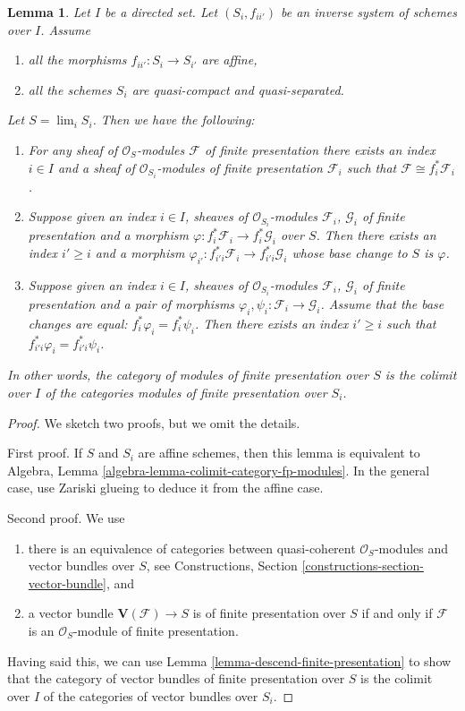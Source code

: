 \documentclass{stacks-project}
\theoremstyle{plain}
\newtheorem{lemma}[subsection]{Lemma}
\theoremstyle{definition}
\theoremstyle{remark}
\numberwithin{equation}{subsection}
\def\lim{\mathop{\mathrm{lim}}\nolimits}
\begin{document}
\begin{lemma}
\label{lemma-descend-modules-finite-presentation}
Let $I$ be a directed set.
Let $(S_i, f_{ii'})$ be an inverse system of schemes over $I$.
Assume
\begin{enumerate}
\item all the morphisms $f_{ii'} : S_i \to S_{i'}$ are affine,
\item all the schemes $S_i$ are quasi-compact and quasi-separated.
\end{enumerate}
Let $S = \lim_i S_i$. Then we have the following:
\begin{enumerate}
\item For any sheaf of $\mathcal{O}_S$-modules
$\mathcal{F}$ of finite presentation there exists an index
$i \in I$ and a sheaf of $\mathcal{O}_{S_i}$-modules of finite
presentation $\mathcal{F}_i$ such that
$\mathcal{F} \cong f_i^*\mathcal{F}_i$.
\item Suppose given an index $i \in I$, sheaves
of $\mathcal{O}_{S_i}$-modules $\mathcal{F}_i$, $\mathcal{G}_i$
of finite presentation and a morphism
$\varphi : f_i^*\mathcal{F}_i \to f_i^*\mathcal{G}_i$ over $S$.
Then there exists an index $i' \geq i$ and a morphism
$\varphi_{i'} : f_{i'i}^*\mathcal{F}_i \to f_{i'i}^*\mathcal{G}_i$
whose base change to $S$ is $\varphi$.
\item Suppose given an index $i \in I$, sheaves of $\mathcal{O}_{S_i}$-modules
$\mathcal{F}_i$, $\mathcal{G}_i$ of finite presentation
and a pair of morphisms $\varphi_i, \psi_i : \mathcal{F}_i \to \mathcal{G}_i$.
Assume that the base changes are equal: $f_i^*\varphi_i = f_i^*\psi_i$.
Then there exists an index $i' \geq i$ such that
$f_{i'i}^*\varphi_i = f_{i'i}^*\psi_i$.
\end{enumerate}
In other words, the category of modules
of finite presentation over $S$ is the colimit over $I$
of the categories modules of finite presentation over $S_i$.
\end{lemma}

\begin{proof}
We sketch two proofs, but we omit the details.

\medskip\noindent
First proof. If $S$ and $S_i$ are affine schemes, then this lemma
is equivalent to
Algebra, Lemma \ref{algebra-lemma-colimit-category-fp-modules}.
In the general case, use Zariski glueing to deduce it from the affine case.

\medskip\noindent
Second proof. We use
\begin{enumerate}
\item there is an equivalence of categories between quasi-coherent
$\mathcal{O}_S$-modules and vector bundles over $S$, see
Constructions, Section \ref{constructions-section-vector-bundle}, and
\item a vector bundle $\mathbf{V}(\mathcal{F}) \to S$ is
of finite presentation over $S$ if and only if $\mathcal{F}$
is an $\mathcal{O}_S$-module of finite presentation.
\end{enumerate}
Having said this, we can use Lemma \ref{lemma-descend-finite-presentation}
to show that the category of vector bundles of finite
presentation over $S$ is the colimit over $I$
of the categories of vector bundles over $S_i$.
\end{proof}
\end{document}
